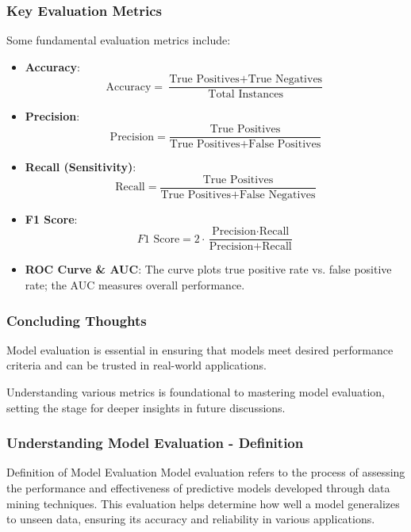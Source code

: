 \documentclass{beamer}
\begin{document}
\begin{frame}[fragile]
    \frametitle{Key Evaluation Metrics}
    Some fundamental evaluation metrics include:

    \begin{itemize}
        \item \textbf{Accuracy}:
        \begin{equation}
            \text{Accuracy} = \frac{\text{True Positives} + \text{True Negatives}}{\text{Total Instances}}
        \end{equation}

        \item \textbf{Precision}:
        \begin{equation}
            \text{Precision} = \frac{\text{True Positives}}{\text{True Positives} + \text{False Positives}}
        \end{equation}

        \item \textbf{Recall (Sensitivity)}:
        \begin{equation}
            \text{Recall} = \frac{\text{True Positives}}{\text{True Positives} + \text{False Negatives}}
        \end{equation}

        \item \textbf{F1 Score}:
        \begin{equation}
            F1 \text{ Score} = 2 \cdot \frac{\text{Precision} \cdot \text{Recall}}{\text{Precision} + \text{Recall}}
        \end{equation}

        \item \textbf{ROC Curve \& AUC}: The curve plots true positive rate vs. false positive rate; the AUC measures overall performance.
    \end{itemize}
\end{frame}

\begin{frame}[fragile]
    \frametitle{Concluding Thoughts}
    Model evaluation is essential in ensuring that models meet desired performance criteria and can be trusted in real-world applications. 

    Understanding various metrics is foundational to mastering model evaluation, setting the stage for deeper insights in future discussions.
\end{frame}

\begin{frame}[fragile]
    \frametitle{Understanding Model Evaluation - Definition}
    \begin{block}{Definition of Model Evaluation}
        Model evaluation refers to the process of assessing the performance and effectiveness of predictive models developed through data mining techniques. This evaluation helps determine how well a model generalizes to unseen data, ensuring its accuracy and reliability in various applications.
    \end{block}
\end{frame}
\end{document}
